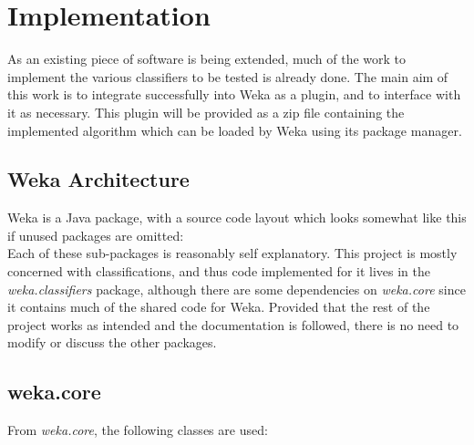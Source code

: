 \section{Implementation}
As an existing piece of software is being extended, much of the work to implement the various classifiers to be tested is already done. The main aim of this work is to integrate successfully into Weka as a plugin, and to interface with it as necessary. This plugin will be provided as a zip file containing the implemented algorithm which can be loaded by Weka using its package manager.
\subsection{Weka Architecture}
Weka is a Java package, with a source code layout which looks somewhat like this if unused packages are omitted: \\
\hfill \break
Each of these sub-packages is reasonably self explanatory. This project is mostly concerned with classifications, and thus code implemented for it lives in the \textit{weka.classifiers} package, although there are some dependencies on \textit{weka.core} since it contains much of the shared code for Weka. Provided that the rest of the project works as intended and the documentation is followed, there is no need to modify or discuss the other packages.

\subsection{weka.core}
From \textit{weka.core}, the following classes are used:

